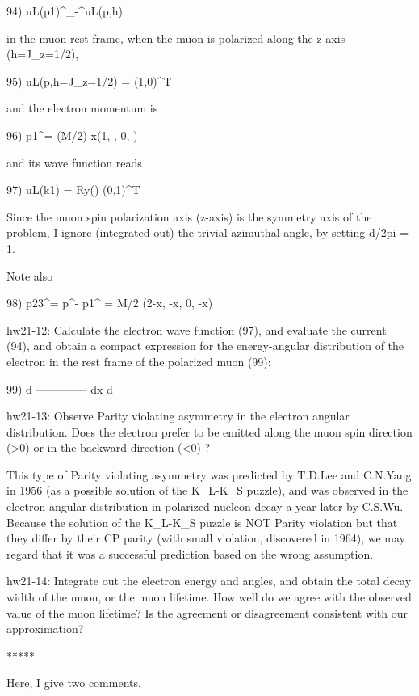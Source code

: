 \documentclass[12pt]{article}
\def\dgr{\dagger}
\begin{document}
{  94) uL(p1)^\dgr \sigma_-^\mu uL(p,h)

  in the muon rest frame, when the muon is polarized along the
  z-axis (h=J_z=1/2),

  95) uL(p,h=J_z=1/2) =  (1,0)^T

  and the electron momentum is

  96) p1^\mu = (M/2) x(1, \sin\theta, 0, \cos\theta)

  and its wave function reads

  97) uL(k1) = Ry(\theta)  (0,1)^T

  Since the muon spin polarization axis (z-axis) is the symmetry axis of
  the problem, I ignore (integrated out) the trivial azimuthal angle,
  by setting \Int d\phi/2pi = 1.

  Note also

  98) p23^\mu = p^\mu - p1^\mu
              = M/2 (2-x, -x\sin\theta, 0, -x\cos\theta)

hw21-12: Calculate the electron wave function (97), and evaluate
  the current (94), and obtain a compact expression for the
  energy-angular distribution of the electron in the rest frame
  of the polarized muon (99):

  99)    d\Gamma
      --------------
      dx d\cos\theta

hw21-13: Observe Parity violating asymmetry in the electron angular
  distribution.  Does the electron prefer to be emitted along the muon
  spin direction (\cos\theta>0) or in the backward direction
  (\cos\theta<0) ?

  This type of Parity violating asymmetry was predicted by T.D.Lee and
  C.N.Yang in 1956 (as a possible solution of the K_L-K_S puzzle), and
  was observed in the electron angular distribution in polarized nucleon
  decay a year later by C.S.Wu.  Because the solution of the K_L-K_S
  puzzle is NOT Parity violation but that they differ by their CP
  parity (with small violation, discovered in 1964), we may regard
  that it was a successful prediction based on the wrong assumption.

hw21-14:  Integrate out the electron energy and angles, and obtain
  the total decay width of the muon, or the muon lifetime.  How well
  do we agree with the observed value of the muon lifetime?  Is the
  agreement or disagreement consistent with our approximation?

                         *****

  Here, I give two comments.

}
\end{document}
